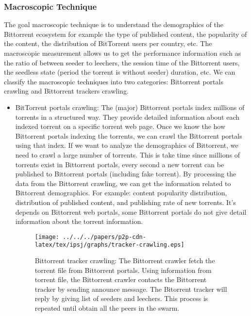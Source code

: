 \subsubsection{Macroscopic Technique}
The goal macroscopic technique is to understand the demographics of the Bittorrent ecosystem for example the type of published content, the popularity of the content, the distribution of BitTorrent users per country, etc. 
The macroscopic measurement allows us to get the performance information such as the ratio of between seeder to leechers, the session time of the Bittorrent users, the seedless state (period the torrent is without seeder) duration, etc.
We can classify the macroscopic techniques into two categories: Bittorrent portals crawling and Bittorrent trackers crawling.

\begin{itemize}
\item BitTorrent portals crawling: 
The (major) Bittorrent portals index millions of torrents in a structured way. 
They provide detailed information about each indexed torrent on a specific torrent web page. 
Once we know the how Bittorrent portals indexing the torrents, we can crawl the Bittorrent portals using that index.
If we want to analyze the demographics of Bittorrent, we need to crawl a large number of torrents.
This is take time since millions of torrents exist in Bittorrent portals, every second a new torrent can be published to Bittorrent portals (including fake torrent).
By processing the data from the Bittorrent crawling, we can get the information related to Bittorrent demographics.
For example: content popularity distribution, distribution of published content, and publishing rate of new torrents.
It's depends on Bittorrent web portals, some Bittorrent portals do not give detail information about the torrent information. 

\begin{figure}[tb]
\begin{center}
\texttt{[image: ../../../papers/p2p-cdn-latex/tex/ipsj/graphs/tracker-crawling.eps]}
\end{center}
\caption{Bittorrent tracker crawling: The Bittorrent crawler fetch the torrent file from Bittorrent portals. Using information from torrent file, the Bittorrent crawler contacts the Bittorrent tracker by sending announce message. The Bitorrent tracker will reply by giving list of seeders and leechers. This process is repeated until obtain all the peers in the swarm.} 
\label{fig:trackercrawling}
\end{figure}



\end{itemize}
